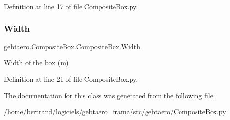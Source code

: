 Definition at line 17 of file Composite\+Box.\+py.

\mbox{\label{classgebtaero_1_1_composite_box_1_1_composite_box_a44593d7302ceb1c46ac637437b5e1061}} 
\subsubsection{\texorpdfstring{Width}{Width}}
{\footnotesize\ttfamily gebtaero.\+Composite\+Box.\+Composite\+Box.\+Width}



Width of the box (m) 



Definition at line 21 of file Composite\+Box.\+py.



The documentation for this class was generated from the following file\+:\begin{DoxyCompactItemize}
\item 
/home/bertrand/logiciels/gebtaero\+\_\+frama/src/gebtaero/\hyperlink{_composite_box_8py}{Composite\+Box.\+py}\end{DoxyCompactItemize}
